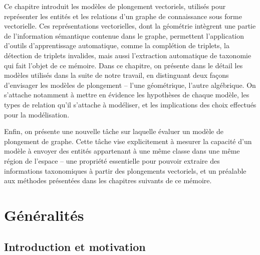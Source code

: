 \label{chap:kge}

Ce chapitre introduit les modèles de plongement vectoriels, utilisés pour représenter les entités et les relations d'un graphe de connaissance sous forme vectorielle. Ces représentations vectorielles, dont la géométrie intègrent une partie de l'information sémantique contenue dans le graphe, permettent l'application d'outils d'apprentissage automatique, comme la complétion de triplets, la détection de triplets invalides, mais aussi l'extraction automatique de taxonomie qui fait l'objet de ce mémoire. Dans ce chapitre, on présente dans le détail les modèles utilisés dans la suite de notre travail, en distinguant deux façons d'envisager les modèles de plongement – l'une géométrique, l'autre algébrique. On s'attache notamment à mettre en évidence les hypothèses de chaque modèle, les types de relation qu'il s'attache à modéliser, et les implications des choix effectués pour la modélisation. %

Enfin, on présente une nouvelle tâche sur laquelle évaluer un modèle de plongement de graphe. Cette tâche vise explicitement à mesurer la capacité d'un modèle à envoyer des entités appartenant à une même classe dans une même région de l'espace – une propriété essentielle pour pouvoir extraire des informations taxonomiques à partir des plongements vectoriels, et un préalable aux méthodes présentées dans les chapitres suivants de ce mémoire.


\section{Généralités}
\label{sec:kge-general}


\subsection{Introduction et motivation}
\label{subsec:kge-general-intro}



